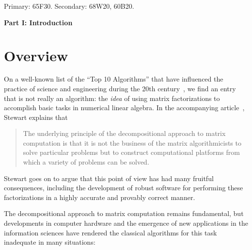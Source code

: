 \documentclass[final]{siamltex}
\newcounter{algorithm}[section]
\newcommand{\pgnotate}[1]{{\color{blue}[#1]}}
\begin{document}
\begin{AMS}[MSC2010]
Primary: 65F30.  Secondary: 68W20, 60B20.  %
\end{AMS}


\pagestyle{myheadings}
\thispagestyle{plain}

\lsp


\begin{center}
{\bf Part I: Introduction}
\end{center}


\section{Overview}
\label{sec:intro}

On a well-known list of the ``Top 10 Algorithms'' that have influenced
the practice of science and engineering during the 20th century~\cite{DS00:Top-10},
we find an entry that is not really an algorithm: the \emph{idea} of using matrix
factorizations to accomplish basic tasks in numerical linear algebra.  In
the accompanying article~\cite{Ste00:Decompositional-Approach}, Stewart
explains that

\lsp
\begin{quote}
The underlying principle of the decompositional approach to matrix computation
is that it is not the business of the matrix algorithmicists to solve particular
problems but to construct computational platforms from which a variety of
problems can be solved.
\end{quote}
\lsp

\noindent
Stewart goes on to argue that this point of view has had many fruitful consequences,
including the development of robust software for performing these factorizations
in a highly accurate and provably correct manner.

%
The decompositional approach to matrix computation remains
fundamental, but developments in computer hardware and the
emergence of new applications in the information sciences
have rendered the classical algorithms for this task inadequate
in many situations:
\end{document}
